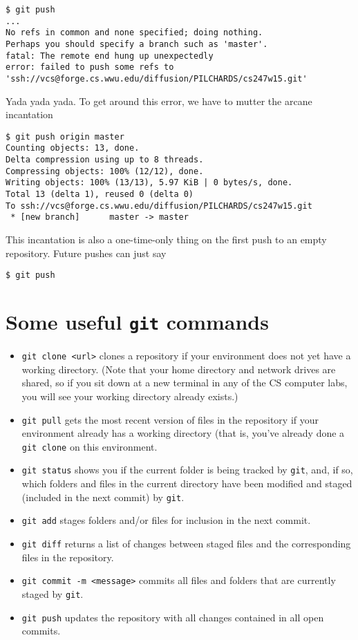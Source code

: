 \documentclass[12pt]{article}
\begin{document}
\begin{verbatim}
$ git push
...
No refs in common and none specified; doing nothing.
Perhaps you should specify a branch such as 'master'.
fatal: The remote end hung up unexpectedly
error: failed to push some refs to 'ssh://vcs@forge.cs.wwu.edu/diffusion/PILCHARDS/cs247w15.git'
\end{verbatim}

Yada yada yada.  To get around this error, we have to mutter the arcane incantation

\begin{verbatim}
$ git push origin master
Counting objects: 13, done.
Delta compression using up to 8 threads.
Compressing objects: 100% (12/12), done.
Writing objects: 100% (13/13), 5.97 KiB | 0 bytes/s, done.
Total 13 (delta 1), reused 0 (delta 0)
To ssh://vcs@forge.cs.wwu.edu/diffusion/PILCHARDS/cs247w15.git
 * [new branch]      master -> master
\end{verbatim}

This incantation is also a one-time-only thing on the first push to an empty repository.  Future pushes can just say

\begin{verbatim}
$ git push
\end{verbatim}

\section{Some useful \texttt{git} commands}

\begin{itemize}
	\item \verb|git clone <url>| clones a repository if your environment does not yet have a working directory.  (Note that your home directory and network drives are shared, so if you sit down at a new terminal in any of the CS computer labs, you will see your working directory already exists.)
	\item \verb|git pull| gets the most recent version of files in the repository if your environment already has a working directory (that is, you've already done a \verb|git clone| on this environment.
	\item \verb|git status| shows you if the current folder is being tracked by \verb|git|, and, if so, which folders and files in the current directory have been modified and staged (included in the next commit) by \verb|git|.
	\item \verb|git add| stages folders and/or files for inclusion in the next commit.
	\item \verb|git diff| returns a list of changes between staged files and the corresponding files in the repository.
	\item \verb|git commit -m <message>| commits all files and folders that are currently staged by \verb|git|.
	\item \verb|git push| updates the repository with all changes contained in all open commits.
\end{itemize}
\end{document}
